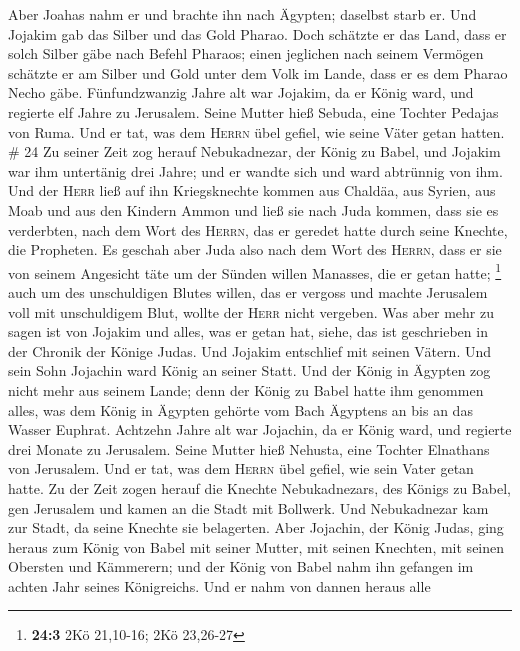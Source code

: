 Aber Joahas nahm er und brachte ihn nach Ägypten; daselbst starb er.
 Und Jojakim gab das Silber und das Gold Pharao. Doch
schätzte er das Land, dass er solch Silber gäbe nach Befehl Pharaos;
einen jeglichen nach seinem Vermögen schätzte er am Silber und Gold
unter dem Volk im Lande, dass er es dem Pharao Necho gäbe.
 Fünfundzwanzig Jahre alt war Jojakim, da er König ward,
und regierte elf Jahre zu Jerusalem. Seine Mutter hieß Sebuda, eine
Tochter Pedajas von Ruma.  Und er tat, was dem
\textsc{Herrn} übel gefiel, wie seine Väter getan hatten. \# 24
 Zu seiner Zeit zog herauf Nebukadnezar, der König zu
Babel, und Jojakim war ihm untertänig drei Jahre; und er wandte sich und
ward abtrünnig von ihm.  Und der \textsc{Herr} ließ auf
ihn Kriegsknechte kommen aus Chaldäa, aus Syrien, aus Moab und aus den
Kindern Ammon und ließ sie nach Juda kommen, dass sie es verderbten,
nach dem Wort des \textsc{Herrn}, das er geredet hatte durch seine
Knechte, die Propheten.  Es geschah aber Juda also nach
dem Wort des \textsc{Herrn}, dass er sie von seinem Angesicht täte um
der Sünden willen Manasses, die er getan hatte; \footnote{\textbf{24:3}
  2Kö 21,10-16; 2Kö 23,26-27}  auch um des unschuldigen
Blutes willen, das er vergoss und machte Jerusalem voll mit unschuldigem
Blut, wollte der \textsc{Herr} nicht vergeben.  Was aber
mehr zu sagen ist von Jojakim und alles, was er getan hat, siehe, das
ist geschrieben in der Chronik der Könige Judas.  Und
Jojakim entschlief mit seinen Vätern. Und sein Sohn Jojachin ward König
an seiner Statt.  Und der König in Ägypten zog nicht mehr
aus seinem Lande; denn der König zu Babel hatte ihm genommen alles, was
dem König in Ägypten gehörte vom Bach Ägyptens an bis an das Wasser
Euphrat.  Achtzehn Jahre alt war Jojachin, da er König
ward, und regierte drei Monate zu Jerusalem. Seine Mutter hieß Nehusta,
eine Tochter Elnathans von Jerusalem.  Und er tat, was dem
\textsc{Herrn} übel gefiel, wie sein Vater getan hatte. 
Zu der Zeit zogen herauf die Knechte Nebukadnezars, des Königs zu Babel,
gen Jerusalem und kamen an die Stadt mit Bollwerk.  Und
Nebukadnezar kam zur Stadt, da seine Knechte sie belagerten.
 Aber Jojachin, der König Judas, ging heraus zum König
von Babel mit seiner Mutter, mit seinen Knechten, mit seinen Obersten
und Kämmerern; und der König von Babel nahm ihn gefangen im achten Jahr
seines Königreichs.  Und er nahm von dannen heraus alle
